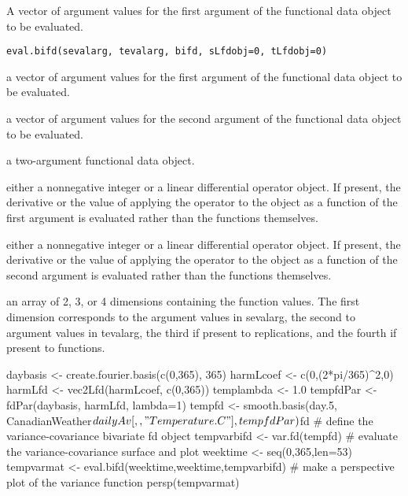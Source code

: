 \documentclass{article}
\begin{document}
\begin{Description}\relax
A vector of argument values for the first argument  of the
functional data object to be evaluated.
\end{Description}
\begin{Usage}
\begin{verbatim}
eval.bifd(sevalarg, tevalarg, bifd, sLfdobj=0, tLfdobj=0)
\end{verbatim}
\end{Usage}
\begin{Arguments}
\begin{ldescription}
\item[\code{sevalarg}] a vector of argument values for the first argument  of the 
functional data object to be evaluated.

\item[\code{tevalarg}] a vector of argument values for the second argument  of the 
functional data object to be evaluated.

\item[\code{bifd}] a two-argument functional data object.

\item[\code{sLfdobj}] either a nonnegative integer or a linear differential operator
object.  If present, the derivative or the value of applying the
operator to the object as a function of the first argument 
is evaluated rather than the functions themselves.

\item[\code{tLfdobj}] either a nonnegative integer or a linear differential operator
object.  If present, the derivative or the value of applying the
operator to the object as a function of the second argument 
is evaluated rather than the functions themselves.

\end{ldescription}
\end{Arguments}
\begin{Value}
an array of 2, 3, or 4 dimensions containing the function values.  The
first dimension corresponds to the argument values in sevalarg, the
second to argument values in tevalarg, the third if present to
replications, and the fourth if present to functions.
\end{Value}
\begin{Examples}
\begin{ExampleCode}
daybasis   <- create.fourier.basis(c(0,365), 365)
harmLcoef  <- c(0,(2*pi/365)^2,0)
harmLfd    <- vec2Lfd(harmLcoef, c(0,365))
templambda <- 1.0
tempfdPar  <- fdPar(daybasis, harmLfd, lambda=1)
tempfd     <- smooth.basis(day.5,
          CanadianWeather$dailyAv[,,"Temperature.C"], tempfdPar)$fd
#    define the variance-covariance bivariate fd object
tempvarbifd <- var.fd(tempfd)
#    evaluate the variance-covariance surface and plot
weektime    <- seq(0,365,len=53)
tempvarmat  <- eval.bifd(weektime,weektime,tempvarbifd)
#    make a perspective plot of the variance function
persp(tempvarmat)
\end{ExampleCode}
\end{Examples}
\end{document}
